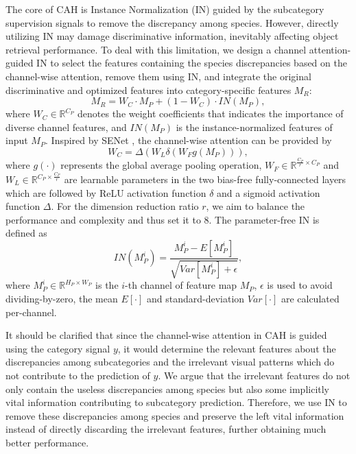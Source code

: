 \documentclass[letterpaper]{article} %
\begin{document}
The core of CAH is Instance Normalization (IN) \cite{DBLP:conf/eccv/PanLST18} guided by the subcategory supervision signals to remove the discrepancy among species. However, directly utilizing IN may damage discriminative information, inevitably affecting object retrieval performance. To deal with this limitation, we design a channel attention-guided IN to select the features containing the species discrepancies based on the channel-wise attention, remove them using IN, and integrate the original discriminative and optimized features into category-specific features $M_R$:
\begin{equation}
M_R = W_C \cdot M_P + (1-W_C) \cdot IN(M_P),
\end{equation}
where $ W_C \in \mathbb{R}^{C_P} $ denotes the weight coefficients that indicates the importance of diverse channel features, and $ IN(M_P) $ is the instance-normalized features of input $ M_P $.
Inspired by SENet \cite{DBLP:conf/cvpr/HuSS18}, the channel-wise attention can be provided by
\begin{equation}
W_C = \Delta(W_L \delta(W_F g(M_P))),
\end{equation}
where $ g(\cdot) $ represents the global average pooling operation, $ W_F \in \mathbb{R}^{\frac{C_P}{r}\times C_P}$ and $ W_L \in \mathbb{R} ^{C_P \times \frac{C_P}{r}} $ are learnable parameters in the two bias-free fully-connected layers which are followed by ReLU activation function $ \delta $ and a sigmoid activation function $ \Delta $. For the dimension reduction ratio $ r $, we aim to balance the performance and complexity and thus set it to 8.
The parameter-free IN is defined as
\begin{equation}
IN(M_P^i) = \frac{M_P^i - E[M_P^i]}{\sqrt{Var[M_P^i]+\epsilon}},
\end{equation}
where $ M_P^i \in \mathbb{R}^{H_P \times W_P}$ is the $ i $-th channel of feature map $ M_P $, $ \epsilon $ is used to avoid dividing-by-zero, the mean $ E[\cdot] $ and standard-deviation $ Var[\cdot] $ are calculated per-channel.


It should be clarified that since the channel-wise attention in CAH is guided using the category signal $y$, it would determine the relevant features about the discrepancies among subcategories and the irrelevant visual patterns which do not contribute to the prediction of $y$. We argue that the irrelevant features do not only contain the useless discrepancies among species but also some implicitly vital information contributing to subcategory prediction. Therefore, we use IN to remove these discrepancies among species and preserve the left vital information instead of directly discarding the irrelevant features, further obtaining much better performance.
\end{document}
